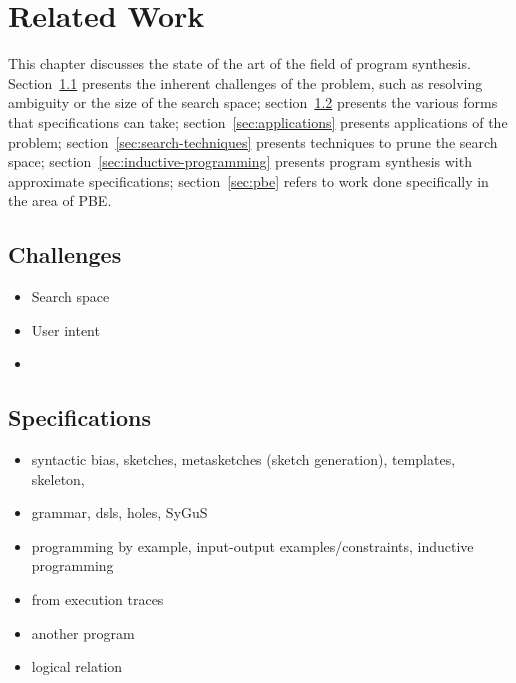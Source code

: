 \chapter{Related Work}
\label{chapter:relatedWork}


This chapter discusses the state of the art of the field of program synthesis.
Section~\ref{sec:challenges} presents the inherent challenges of the problem,
such as resolving ambiguity or the size of the search space;
section~\ref{sec:specifications} presents the various forms
that specifications can take;
section~\ref{sec:applications} presents applications of the problem;
section~\ref{sec:search-techniques} presents techniques to prune the search
space;
section~\ref{sec:inductive-programming} presents program synthesis with
approximate specifications;
section~\ref{sec:pbe} refers to work done specifically in the area of
\ac{PBE}.

\section{Challenges}
\label{sec:challenges}

\begin{itemize}
\item Search space
\item User intent
  \item 
\end{itemize}

\section{Specifications}
\label{sec:specifications}

\begin{itemize}
\item syntactic bias, sketches, metasketches (sketch generation), templates, skeleton,
\item   grammar, dsls, holes, SyGuS
\item programming by example, input-output examples/constraints, inductive programming
\item from execution traces
\item another program
\item logical relation
\end{itemize}

